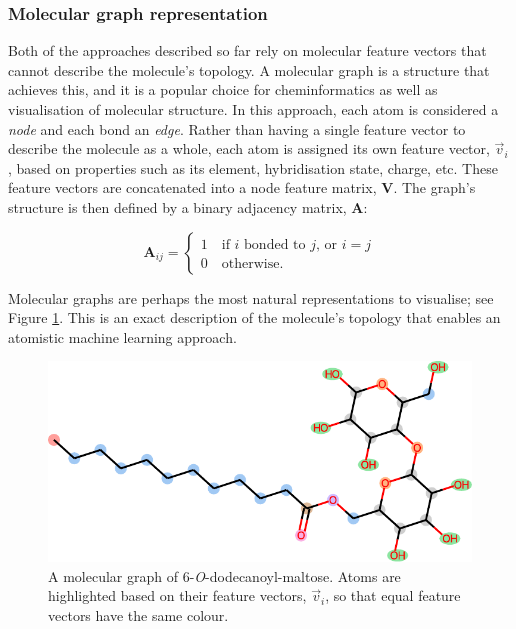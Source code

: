 \subsubsection{Molecular graph representation}

Both of the approaches described so far rely on molecular feature vectors that
cannot describe the molecule's topology. A molecular graph is a structure that
achieves this, and it is a popular choice for cheminformatics as well as
visualisation of molecular structure. In this approach, each atom is considered
a \emph{node} and each bond an \emph{edge}. Rather than having a single feature
vector to describe the molecule as a whole, each atom is assigned its own
feature vector, $\vec{v}_i$, based on properties such as its element,
hybridisation state, charge, etc. These feature vectors are concatenated into a
node feature matrix, $\mathbf{V}$. The graph's structure is then defined by a
binary adjacency matrix, $\mathbf{A}$:

\begin{equation}
    \label{eq:adjacency-mat}
    \mathbf{A}_{ij} = \begin{cases}
        1 \quad \text{if } i \text { bonded to } j \text{, or } i = j \\
        0 \quad \text{otherwise.}
    \end{cases}
\end{equation}

Molecular graphs are perhaps the most natural representations to visualise; see
Figure \ref{fig:mol-graph}. This is an exact description of the molecule's
topology that enables an atomistic machine learning approach.

\begin{figure}
    \centering
    \includegraphics[width=.8\linewidth]{images/molecular-graph.pdf}
    \caption{A molecular graph of 6-\textit{O}-dodecanoyl-maltose. Atoms are
        highlighted based on their feature vectors, $\vec{v}_i$, so that equal
        feature vectors have the same colour.}
    \label{fig:mol-graph}
\end{figure}


